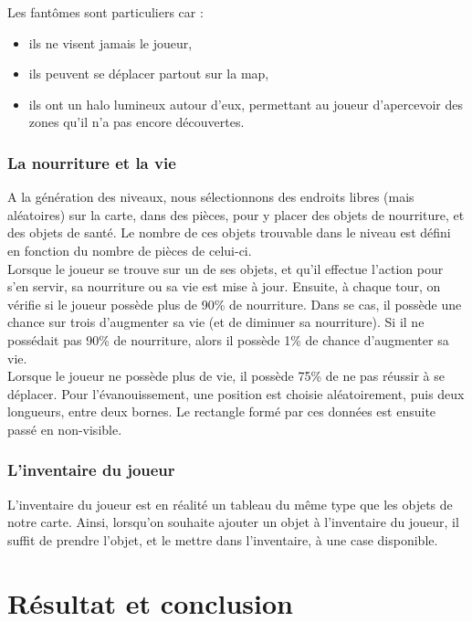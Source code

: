 \documentclass[11pt]{report}
\begin{document}
		Les fantômes sont particuliers car :
		\begin{itemize}
			\item ils ne visent jamais le joueur,
			\item ils peuvent se déplacer partout sur la map,
			\item ils ont un halo lumineux autour d'eux, permettant au joueur d'apercevoir des zones qu'il n'a pas encore découvertes.
		\end{itemize}
		
		\subsection{La nourriture et la vie}
		
		A la génération des niveaux, nous sélectionnons des endroits libres (mais aléatoires) sur la carte, dans des pièces, pour y placer des objets de nourriture, et des objets de santé. Le nombre de ces objets trouvable dans le niveau est défini en fonction du nombre de pièces de celui-ci. \\ Lorsque le joueur se trouve sur un de ses objets, et qu'il effectue l'action pour s'en servir, sa nourriture ou sa vie est mise à jour. Ensuite, à chaque tour, on vérifie si le joueur possède plus de 90\% de nourriture. Dans se cas, il possède une chance sur trois d'augmenter sa vie (et de diminuer sa nourriture). Si il ne possédait pas 90\% de nourriture, alors il possède 1\% de chance d'augmenter sa vie.\\
		Lorsque le joueur ne possède plus de vie, il possède 75\% de ne pas réussir à se déplacer. Pour l'évanouissement, une position est choisie aléatoirement, puis deux longueurs, entre deux bornes. Le rectangle formé par ces données est ensuite passé en non-visible.
		
		\subsection{L'inventaire du joueur}

		L'inventaire du joueur est en réalité un tableau du même type que les objets de notre carte. Ainsi, lorsqu'on souhaite ajouter un objet à l'inventaire du joueur, il suffit de prendre l'objet, et le mettre dans l'inventaire, à une case disponible.

\chapter{Résultat et conclusion}
\end{document}
